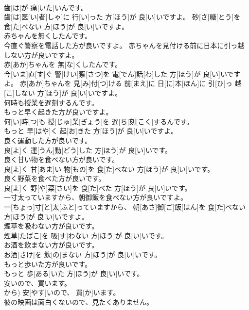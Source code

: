 \documentclass[8pt]{extreport}
\begin{document}
\begin{CJK}{UTF8}{min}
\\	歯[は]が 痛[いた]いんです。 
\\	歯[は]医[い]者[しゃ]に 行[い]った 方[ほう]が 良[い]いですよ。 砂[さ]糖[とう]を 食[た]べない 方[ほう]が 良[い]いですよ。
\\	赤ちゃんを無くしたんです。 
\\	今直ぐ警察を電話した方が良いですよ。 赤ちゃんを見付ける前に日本に引っ越しない方が良いですよ。	
\\	赤[あか]ちゃんを 無[な]くしたんです。 
\\	今[いま]直[す]ぐ 警[けい]察[さつ]を 電[でん]話[わ]した 方[ほう]が 良[い]いですよ。 赤[あか]ちゃんを 見[み]付[つ]ける 前[まえ]に 日[に]本[ほん]に 引[ひ]っ 越[こ]しない 方[ほう]が 良[い]いですよ。
\\	何時も授業を遅刻するんです。 
\\	もっと早く起きた方が良いですよ。	
\\	何[い]時[つ]も 授[じゅ]業[ぎょう]を 遅[ち]刻[こく]するんです。 
\\	もっと 早[はや]く 起[お]きた 方[ほう]が 良[い]いですよ。
\\	良く運動した方が良いです。	
\\	良[よ]く 運[うん]動[どう]した 方[ほう]が 良[い]いです。
\\	良く甘い物を食べない方が良いです。	
\\	良[よ]く 甘[あま]い 物[もの]を 食[た]べない 方[ほう]が 良[い]いです。
\\	良く野菜を食べた方が良いです。	
\\	良[よ]く 野[や]菜[さい]を 食[た]べた 方[ほう]が 良[い]いです。
\\	一寸太っていますから、朝御飯を食べない方が良いですよ。	
\\	一[ちょっ]寸[と]太[ふと]っていますから、 朝[あさ]御[ご]飯[はん]を 食[た]べない 方[ほう]が 良[い]いですよ。
\\	煙草を吸わない方が良いです。	
\\	煙草[たばこ]を 吸[す]わない 方[ほう]が 良[い]いです。
\\	お酒を飲まない方が良いです。	
\\	お酒[さけ]を 飲[の]まない 方[ほう]が 良[い]いです。
\\	もっと歩いた方が良いです。	
\\	もっと 歩[ある]いた 方[ほう]が 良[い]いです。
\\	安いので、買います。	
\\	から)	安[やす]いので、 買[か]います。
\\	彼の映画は面白くないので、見たくありません。	

\end{CJK}
\end{document}
